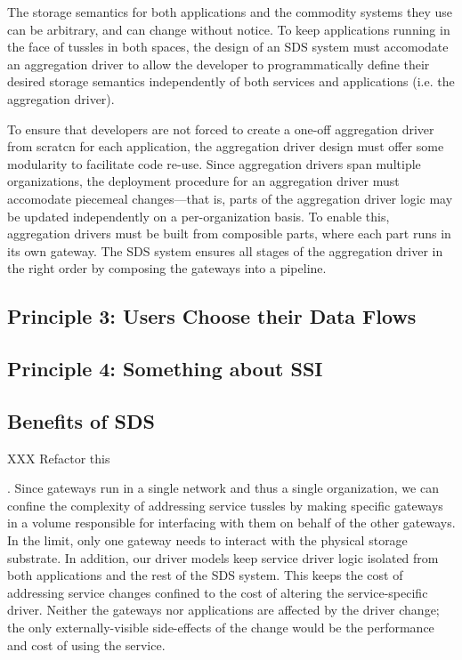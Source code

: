 The storage semantics for both applications and the commodity systems they use can be
arbitrary, and can change without notice.  To keep applications running in the
face of tussles in both spaces, the design of an SDS system must
accomodate an aggregation driver
to allow the developer to programmatically define
their desired storage semantics independently of both services and
applications (i.e. the aggregation driver).  

To ensure that developers
are not forced to create a one-off aggregation driver from scratcn for each
application, the aggregation driver design must offer some modularity to
facilitate code re-use.  Since aggregation drivers span multiple organizations,
the deployment procedure for an aggregation driver must accomodate piecemeal
changes---that is, parts of the aggregation driver logic may be updated
independently on a per-organization basis.  To enable this, aggregation drivers
must be built from composible parts, where each part runs in its own gateway.
The SDS system ensures all stages of the aggregation driver in the right order
by composing the gateways into a pipeline.

\subsection{Principle 3: Users Choose their Data Flows}


\subsection{Principle 4: Something about SSI} 



% 

\subsection{Benefits of SDS}

XXX Refactor this

.  Since gateways run in a
single network and thus a single organization, we can confine the complexity of
addressing service tussles by making specific gateways in a volume responsible
for interfacing with them on behalf of the other gateways.  In the limit, only
one gateway needs to interact with the physical storage substrate.  In addition,
our driver models keep service driver logic isolated from both applications
and the rest of the SDS system.  This keeps the cost of addressing service
changes confined to the cost of altering the service-specific driver.  Neither
the gateways nor applications are affected by the driver change; the only
externally-visible side-effects of the change would be the performance and cost
of using the service.


